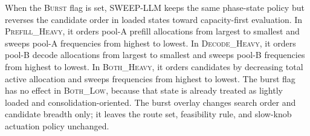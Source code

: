 When the \textsc{Burst} flag is set, SWEEP-LLM keeps the same phase-state policy but reverses the candidate order in loaded states toward capacity-first evaluation.
In \textsc{Prefill\_Heavy}, it orders pool-A prefill allocations from largest to smallest and sweeps pool-A frequencies from highest to lowest.
In \textsc{Decode\_Heavy}, it orders pool-B decode allocations from largest to smallest and sweeps pool-B frequencies from highest to lowest.
In \textsc{Both\_Heavy}, it orders candidates by decreasing total active allocation and sweeps frequencies from highest to lowest.
The burst flag has no effect in \textsc{Both\_Low}, because that state is already treated as lightly loaded and consolidation-oriented.
The burst overlay changes search order and candidate breadth only; it leaves the route set, feasibility rule, and slow-knob actuation policy unchanged.


